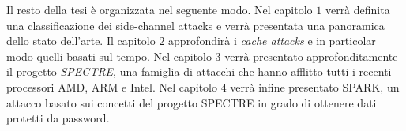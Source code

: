 	 Il resto della tesi è organizzata nel seguente modo. Nel capitolo $1$ verrà definita una classificazione dei side-channel attacks e verrà presentata una panoramica dello stato dell'arte. Il capitolo $2$ approfondirà i \emph{cache attacks} e in particolar modo quelli basati sul tempo.
	 Nel capitolo $3$ verrà presentato approfonditamente il progetto \emph{SPECTRE}, una famiglia di attacchi che hanno afflitto tutti i recenti processori AMD, ARM e Intel.
	 Nel capitolo $4$ verrà infine presentato \ac{SPARK}, un attacco basato sui concetti del progetto SPECTRE in grado di ottenere dati protetti da password.
